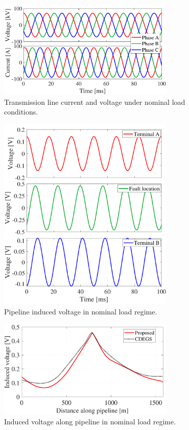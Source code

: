 \documentclass[5p,twocolumn]{elsarticle}
\begin{document}
\begin{figure}[h]
	\begin{center}
		\includegraphics[width=8.4cm]{img/NLindVoltage_TL.pdf}    %
		\caption{Transmission line current and voltage under nominal load conditions.} 
		\label{fig:NLindVoltageTL}
	\end{center}
\end{figure}

\begin{figure}[h]
	\begin{center}
		\includegraphics[width=8.4cm]{img/NLindVoltage_3plots.pdf}    %
		\caption{Pipeline induced voltage in nominal load regime.} 
		\label{fig:NLindVoltage3plots}
	\end{center}
\end{figure}

\begin{figure}[h]
	\begin{center}
		\includegraphics[width=8.4cm]{img/NLindVoltage.pdf}    %
		\caption{Induced voltage along pipeline in nominal load regime.} 
		\label{fig:NLindVoltage}
	\end{center}
\end{figure}
\end{document}

